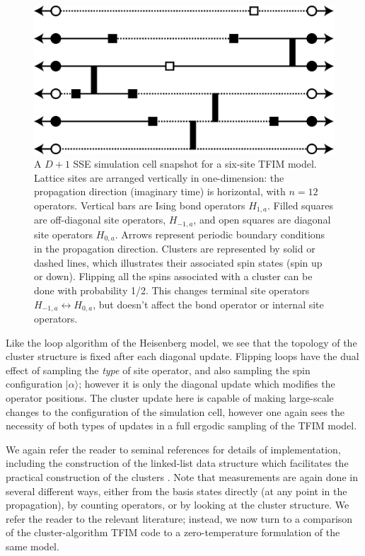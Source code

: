 \documentclass[vecphys]{svmult}
\begin{document}
\begin{figure}[t]
\centering
\includegraphics*[width=.9\textwidth]{finiteT_tfim.eps}
\caption[]{A $D+1$ SSE simulation cell snapshot for a six-site TFIM model.  Lattice sites are arranged vertically in one-dimension: the propagation direction (imaginary time) is horizontal, with $n=12$ operators.  
Vertical bars are Ising bond operators $H_{1,a}$.  Filled squares are off-diagonal site operators, $H_{-1,a}$, and open squares are diagonal site operators $H_{0,a}$.
Arrows represent periodic boundary conditions in the propagation direction.  
Clusters are represented by solid or dashed lines, which illustrates their associated spin states (spin up or down).  Flipping all the spins associated with a cluster can be done with probability 1/2.  This changes terminal site operators $H_{-1,a} \leftrightarrow H_{0,a}$, but doesn't affect the bond operator or internal site operators.}
\label{fig:4}      
\end{figure} 

Like the loop algorithm of the Heisenberg model, we see that the topology of the cluster structure is fixed after each diagonal update.  Flipping loops have the dual effect of sampling the {\em type} of site operator, and also sampling the spin configuration $|\alpha \rangle$; however it is only the diagonal update which modifies the operator positions.  
The cluster update here is capable of making large-scale changes to the configuration of the simulation cell, however one again sees the necessity of both types of updates in a full ergodic sampling of the TFIM model.

We again refer the reader to seminal references for details of implementation, including the construction of the linked-list data structure which facilitates the practical construction of the clusters \cite{Melko:Sandvik03}.  Note that measurements are again done in several different ways, either from the basis states directly (at any point in the propagation), by counting operators, or by looking at the cluster structure.  We refer the reader to the relevant literature; instead, we now turn to a comparison of the cluster-algorithm TFIM code to a zero-temperature formulation of the same model.
\end{document}
